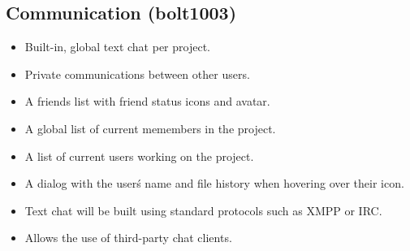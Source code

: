 \documentclass[11pt]{report}
\begin{document}
    \subsection{Communication (bolt1003)}
        \begin{itemize}
            \item Built-in, global text chat per project.
            \item Private communications between other users.
            \item A friends list with friend status icons and avatar.
            \item A global list of current memembers in the project.
            \item A list of current users working on the project.
            \item A dialog with the user\'s name and file history when hovering over their icon.
            \item Text chat will be built using standard protocols such as XMPP or IRC.
            \item Allows the use of third-party chat clients.
        \end{itemize}
\end{document}
